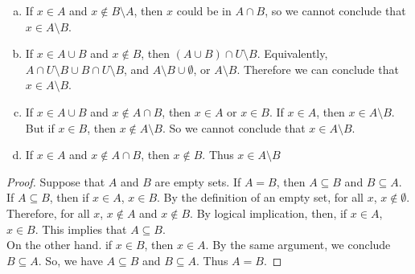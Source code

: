 \documentclass[12pt]{scrartcl} %
\begin{document}
\begin{enumerate}[(a)]
	\item If $x \in A$ and $x \notin B\setminus A$, then $x$ could be in $A \cap B$, so we cannot conclude that $x \in A \setminus B$.
	\item If $x \in A \cup B$ and $x \notin B$, then $(A \cup B) \cap U\setminus B$. Equivalently, $A \cap U\setminus B \cup B \cap U\setminus B$, and $A\setminus B \cup \emptyset$, or $A\setminus B$. Therefore we can conclude that $x \in A\setminus B$.
	\item If $x \in A \cup B$ and $x \notin A \cap B$, then $x \in A$ or $x \in B$. If $x \in A$, then $x \in A\setminus B$. But if $x \in B$, then $x \notin A\setminus B$. So we cannot conclude that $x \in A\setminus B$.
	\item If $x \in A$ and $x \notin A \cap B$, then $x \notin B$. Thus $x \in A\setminus B$
\end{enumerate}

\begin{proof}
Suppose that $A$ and $B$ are empty sets. If $A = B$, then $A \subseteq B$ and $B \subseteq A$. \\
If $A \subseteq B$, then if $x \in A$, $x \in B$. By the definition of an empty set, for all $x$, $x \notin \emptyset$. Therefore, for all $x$, $x \notin A$ and $x \notin B$. By logical implication, then, if $x \in A$, $x \in B$. This implies that $A \subseteq B$. \\
On the other hand. if $x \in B$, then $x \in A$. By the same argument, we conclude $B \subseteq A$. So, we have $A \subseteq B$ and $B \subseteq A$. Thus $A = B$.
\end{proof}
\end{document}
